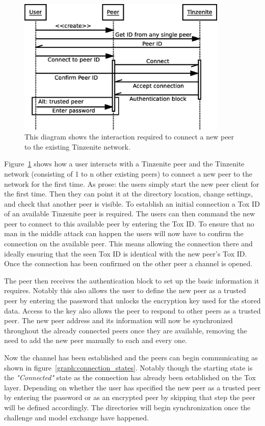 \begin{figure}[htp]
\centering
    \includegraphics[width=10cm]{diagram/sequence_new_connect}
\caption[New Connection Sequence Diagram]{This diagram shows the interaction required to connect a new peer to the existing Tinzenite network.}
\label{diagram:new_connection}
\end{figure}

Figure~\ref{diagram:new_connection} shows how a user interacts with a Tinzenite peer and the Tinzenite network (consisting of 1 to n other existing peers) to connect a new peer to the network for the first time.
As prose: the users simply start the new peer client for the first time.
Then they can point it at the directory location, change settings, and check that another peer is visible.
To establish an initial connection a Tox ID of an available Tinzenite peer is required.
The users can then command the new peer to connect to this available peer by entering the Tox ID.
To ensure that no man in the middle attack can happen the users will now have to confirm the connection on the available peer.
This means allowing the connection there and ideally ensuring that the seen Tox ID is identical with the new peer's Tox ID.
Once the connection has been confirmed on the other peer a channel is opened.

The peer then receives the authentication block to set up the basic information it requires.
Notably this also allows the user to define the new peer as a trusted peer by entering the password that unlocks the encryption key used for the stored data.
Access to the key also allows the peer to respond to other peers as a trusted peer.
The new peer address and its information will now be synchronized throughout the already connected peers once they are available, removing the need to add the new peer manually to each and every one.

Now the channel has been established and the peers can begin communicating as shown in figure~\ref{graph:connection_states}.
Notably though the starting state is the \textit{"Connected"} state as the connection has already been established on the Tox layer.
Depending on whether the user has specified the new peer as a trusted peer by entering the password or as an encrypted peer by skipping that step the peer will be defined accordingly.
The directories will begin synchronization once the challenge and model exchange have happened.

